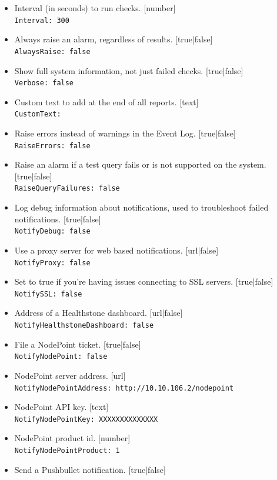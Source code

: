 \documentclass[11pt]{article}
\begin{document}
\begin{itemize}
\item Interval (in seconds) to run checks. [number]\\
\texttt{Interval: 300}
\item Always raise an alarm, regardless of results. [true|false]\\
\texttt{AlwaysRaise: false}
\item Show full system information, not just failed checks. [true|false]\\
\texttt{Verbose: false}
\item Custom text to add at the end of all reports. [text]\\
\texttt{CustomText:}
\item Raise errors instead of warnings in the Event Log. [true|false]\\
\texttt{RaiseErrors: false}
\item Raise an alarm if a test query fails or is not supported on the system. [true|false]\\
\texttt{RaiseQueryFailures: false}
\item Log debug information about notifications, used to troubleshoot failed notifications. [true|false]\\
\texttt{NotifyDebug: false}
\item Use a proxy server for web based notifications. [url|false]\\
\texttt{NotifyProxy: false}
\item Set to true if you're having issues connecting to SSL servers. [true|false]\\
\texttt{NotifySSL: false}
\item Address of a Healthstone dashboard. [url|false]\\
\texttt{NotifyHealthstoneDashboard: false}
\item File a NodePoint ticket. [true|false]\\
\texttt{NotifyNodePoint: false}
\item NodePoint server address. [url]\\
\texttt{NotifyNodePointAddress: http://10.10.106.2/nodepoint}
\item NodePoint API key. [text]\\
\texttt{NotifyNodePointKey: XXXXXXXXXXXXXX}
\item NodePoint product id. [number]\\
\texttt{NotifyNodePointProduct: 1}
\item Send a Pushbullet notification. [true|false]\\

\end{itemize}
\end{document}
